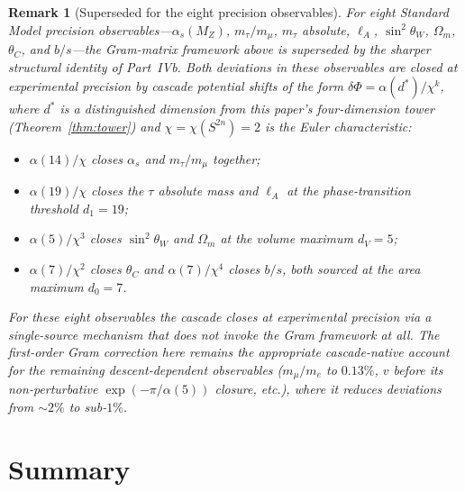 \documentclass[11pt,a4paper]{article}
\newtheorem{remark}[theorem]{Remark}
\begin{document}
\begin{remark}[Superseded for the eight precision observables]\label{rem:superseded-by-family}
For eight Standard Model precision observables---$\alpha_s(M_Z)$, $m_\tau/m_\mu$, $m_\tau$ absolute, $\ell_A$, $\sin^2\theta_W$, $\Omega_m$, $\theta_C$, and $b/s$---the Gram-matrix framework above is superseded by the sharper structural identity of Part~IVb. Both deviations in these observables are closed \emph{at experimental precision} by cascade potential shifts of the form $\delta\Phi = \alpha(d^*)/\chi^k$, where $d^*$ is a distinguished dimension from this paper's four-dimension tower (Theorem~\ref{thm:tower}) and $\chi=\chi(S^{2n})=2$ is the Euler characteristic:
\begin{itemize}
\item $\alpha(14)/\chi$ closes $\alpha_s$ and $m_\tau/m_\mu$ together;
\item $\alpha(19)/\chi$ closes the $\tau$ absolute mass and $\ell_A$ at the phase-transition threshold $d_1=19$;
\item $\alpha(5)/\chi^3$ closes $\sin^2\theta_W$ and $\Omega_m$ at the volume maximum $d_V=5$;
\item $\alpha(7)/\chi^2$ closes $\theta_C$ and $\alpha(7)/\chi^4$ closes $b/s$, both sourced at the area maximum $d_0=7$.
\end{itemize}
For these eight observables the cascade closes at experimental precision via a single-source mechanism that does not invoke the Gram framework at all. The first-order Gram correction here remains the appropriate cascade-native account for the remaining descent-dependent observables ($m_\mu/m_e$ to $0.13\%$, $v$ before its non-perturbative $\exp(-\pi/\alpha(5))$ closure, etc.), where it reduces deviations from $\sim 2\%$ to sub-$1\%$.
\end{remark}

\section{Summary}\label{sec:summary}
\end{document}
